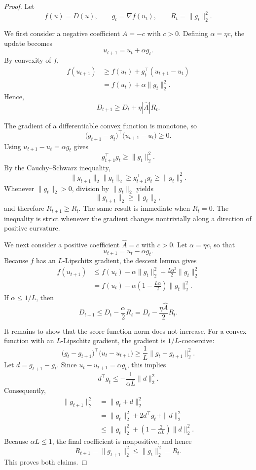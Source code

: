\documentclass{article}
\theoremstyle{plain}
\theoremstyle{definition}
\theoremstyle{remark}
\begin{document}
\begin{proof}
Let
\[
    f(u)=D(u),
    \qquad
    g_t=\nabla f(u_t),
    \qquad
    R_t=\|g_t\|_2^2.
\]

We first consider a negative coefficient
$\widehat{A}=-c$ with $c>0$. Defining
$\alpha=\eta c$, the update becomes
\[
    u_{t+1}
    =
    u_t+\alpha g_t.
\]
By convexity of $f$,
\begin{align}
    f(u_{t+1})
    &\geq
    f(u_t)
    +
    g_t^\top(u_{t+1}-u_t) \\
    &=
    f(u_t)+\alpha\|g_t\|_2^2.
\end{align}
Hence,
\[
    D_{t+1}
    \geq
    D_t+\eta|\widehat{A}|R_t.
\]

The gradient of a differentiable convex function is monotone, so
\[
    \bigl(g_{t+1}-g_t\bigr)^\top
    \bigl(u_{t+1}-u_t\bigr)
    \geq0.
\]
Using $u_{t+1}-u_t=\alpha g_t$ gives
\[
    g_{t+1}^\top g_t
    \geq
    \|g_t\|_2^2.
\]
By the Cauchy--Schwarz inequality,
\[
    \|g_{t+1}\|_2\|g_t\|_2
    \geq
    g_{t+1}^\top g_t
    \geq
    \|g_t\|_2^2.
\]
Whenever $\|g_t\|_2>0$, division by $\|g_t\|_2$ yields
\[
    \|g_{t+1}\|_2
    \geq
    \|g_t\|_2,
\]
and therefore $R_{t+1}\geq R_t$. The same result is immediate when
$R_t=0$. The inequality is strict whenever the gradient changes
nontrivially along a direction of positive curvature.

We next consider a positive coefficient
$\widehat{A}=c$ with $c>0$. Let
$\alpha=\eta c$, so that
\[
    u_{t+1}
    =
    u_t-\alpha g_t.
\]
Because $f$ has an $L$-Lipschitz gradient, the descent lemma gives
\begin{align}
    f(u_{t+1})
    &\leq
    f(u_t)
    -
    \alpha\|g_t\|_2^2
    +
    \frac{L\alpha^2}{2}\|g_t\|_2^2 \\
    &=
    f(u_t)
    -
    \alpha
    \left(
        1-\frac{L\alpha}{2}
    \right)
    \|g_t\|_2^2.
\end{align}
If $\alpha\leq1/L$, then
\[
    D_{t+1}
    \leq
    D_t-\frac{\alpha}{2}R_t
    =
    D_t-\frac{\eta\widehat{A}}{2}R_t.
\]

It remains to show that the score-function norm does not increase.
For a convex function with an $L$-Lipschitz gradient, the gradient is
$1/L$-cocoercive:
\[
    \bigl(g_t-g_{t+1}\bigr)^\top
    \bigl(u_t-u_{t+1}\bigr)
    \geq
    \frac{1}{L}
    \|g_t-g_{t+1}\|_2^2.
\]
Let $d=g_{t+1}-g_t$. Since
$u_t-u_{t+1}=\alpha g_t$, this implies
\[
    d^\top g_t
    \leq
    -
    \frac{1}{\alpha L}
    \|d\|_2^2.
\]
Consequently,
\begin{align}
    \|g_{t+1}\|_2^2
    &=
    \|g_t+d\|_2^2 \\
    &=
    \|g_t\|_2^2
    +
    2d^\top g_t
    +
    \|d\|_2^2 \\
    &\leq
    \|g_t\|_2^2
    +
    \left(
        1-\frac{2}{\alpha L}
    \right)
    \|d\|_2^2.
\end{align}
Because $\alpha L\leq1$, the final coefficient is nonpositive, and hence
\[
    R_{t+1}
    =
    \|g_{t+1}\|_2^2
    \leq
    \|g_t\|_2^2
    =
    R_t.
\]
This proves both claims.
\end{proof}
\end{document}
